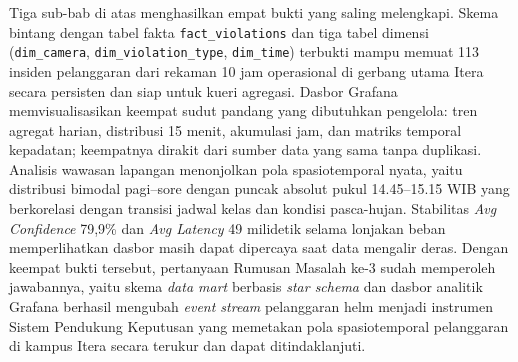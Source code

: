 Tiga sub-bab di atas menghasilkan empat bukti yang saling melengkapi. Skema bintang dengan tabel fakta \texttt{fact\_violations} dan tiga tabel dimensi (\texttt{dim\_camera}, \texttt{dim\_violation\_type}, \texttt{dim\_time}) terbukti mampu memuat 113 insiden pelanggaran dari rekaman 10 jam operasional di gerbang utama Itera secara persisten dan siap untuk kueri agregasi. Dasbor Grafana memvisualisasikan keempat sudut pandang yang dibutuhkan pengelola: tren agregat harian, distribusi 15 menit, akumulasi jam, dan matriks temporal kepadatan; keempatnya dirakit dari sumber data yang sama tanpa duplikasi. Analisis wawasan lapangan menonjolkan pola spasiotemporal nyata, yaitu distribusi bimodal pagi--sore dengan puncak absolut pukul 14.45--15.15 WIB yang berkorelasi dengan transisi jadwal kelas dan kondisi pasca-hujan. Stabilitas \textit{Avg Confidence} 79,9\% dan \textit{Avg Latency} 49 milidetik selama lonjakan beban memperlihatkan dasbor masih dapat dipercaya saat data mengalir deras. Dengan keempat bukti tersebut, pertanyaan Rumusan Masalah ke-3 sudah memperoleh jawabannya, yaitu skema \textit{data mart} berbasis \textit{star schema} dan dasbor analitik Grafana berhasil mengubah \textit{event stream} pelanggaran helm menjadi instrumen Sistem Pendukung Keputusan yang memetakan pola spasiotemporal pelanggaran di kampus Itera secara terukur dan dapat ditindaklanjuti.

